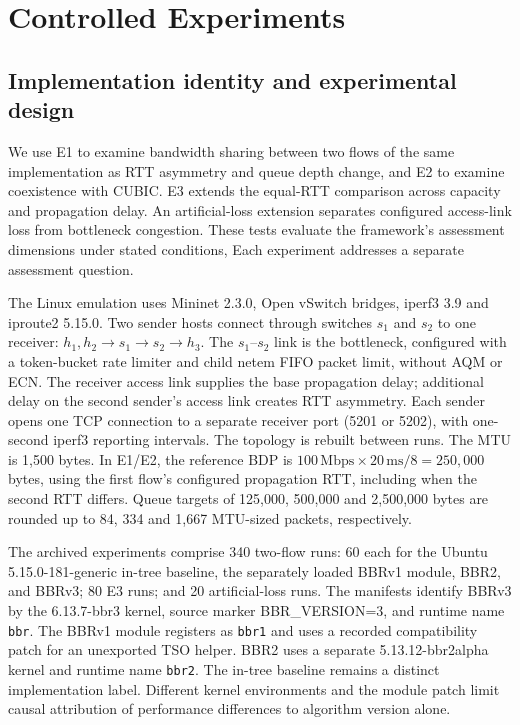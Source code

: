 \section{Controlled Experiments}
\label{sec:controlled_experiments}

\subsection{Implementation identity and experimental design}
We use E1 to examine bandwidth sharing between two flows of the same
implementation as RTT asymmetry and queue depth change, and E2 to examine
coexistence with CUBIC. E3 extends the equal-RTT comparison across capacity
and propagation delay. An artificial-loss extension separates configured
access-link loss from bottleneck congestion. These tests evaluate the
framework's assessment dimensions under stated conditions, Each experiment addresses a separate assessment question.

The Linux emulation uses Mininet 2.3.0, Open vSwitch bridges, iperf3 3.9
and iproute2 5.15.0. Two sender hosts connect through switches $s_1$ and
$s_2$ to one receiver: $h_1,h_2\rightarrow s_1\rightarrow s_2\rightarrow h_3$.
The $s_1$--$s_2$ link is the bottleneck, configured with a token-bucket
rate limiter and child netem FIFO packet limit, without AQM or ECN.
The receiver access link supplies the base propagation delay; additional
delay on the second sender's access link creates RTT asymmetry. Each
sender opens one TCP connection to a separate receiver port (5201 or
5202), with one-second iperf3 reporting intervals. The topology is rebuilt
between runs. The MTU is 1,500 bytes. In E1/E2, the reference BDP is
$100\,\mathrm{Mbps}\times20\,\mathrm{ms}/8=250,000$ bytes, using the first
flow's configured propagation RTT, including when the second RTT differs.
Queue targets of 125,000, 500,000 and 2,500,000 bytes are rounded up to
84, 334 and 1,667 MTU-sized packets, respectively.

The archived experiments comprise 340 two-flow runs: 60 each for the
Ubuntu 5.15.0-181-generic in-tree baseline, the separately loaded BBRv1 module, BBR2, and
BBRv3; 80 E3 runs; and 20 artificial-loss runs. The manifests identify
BBRv3 by the 6.13.7-bbr3 kernel, source marker BBR\_VERSION=3, and runtime
name \texttt{bbr}. The BBRv1 module registers as \texttt{bbr1} and uses
a recorded compatibility patch for an unexported TSO helper. BBR2 uses
a separate 5.13.12-bbr2alpha kernel and runtime name \texttt{bbr2}.
The in-tree baseline remains a distinct implementation label.
Different kernel environments and the module patch limit causal
attribution of performance differences to algorithm version alone.


